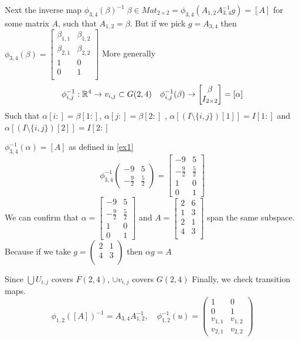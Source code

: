 \documentclass[11pt,a4paper]{report}
\begin{document}
Next the inverse map  $\phi_{3,4}(\beta)^{-1} \; \beta \in Mat_{2 \times 2} = \phi_{3,4}(A_{1,2} A_{3,4}^{-1} g) = [A] $ for some matrix $A$, such that $A_{1,2} = \beta$.
But if we pick $g = A_{3,4}$ then 
$ \phi_{3,4}(\beta) =
\begin{bmatrix}
    \beta_{1,1} & \beta_{1,2} \\ 
    \beta_{2,1} & \beta_{2,2} \\
    1 & 0 \\ 
    0 & 1 \\
\end{bmatrix}
$
More generally
$$\phi_{i,j}^{-1} : \mathbb{R}^4 \to v_{i,j} \subset G(2,4) \quad \phi_{i,j}^{-1}(\beta) \to 
\begin{bmatrix}
    \beta \\
    I_{2 \times 2}
\end{bmatrix} = [\alpha]
$$
Such that $\alpha [i:] = \beta[1:]$, $\alpha[j:] = \beta[2:]$ , $\alpha[ (I \setminus \{i,j\})[1] ] = I[1:]$ and
$\alpha[ (I \setminus \{i,j \})[2] ] = I[2:]$
\newline
\begin{Ex}
   $ \phi_{3,4}^{-1} (\alpha) = [A] $ as defined in \ref{ex1}
   $$ \phi_{3,4}^{-1}  \begin{pmatrix} -9 & 5 \\ -\frac{9}{2} & \frac{5}{2} \end{pmatrix} = \begin{bmatrix} -9 & 5 \\ -\frac{9}{2} & \frac{5}{2} \\ 1 & 0 \\ 0 & 1 \end{bmatrix} $$ 
   We can confirm that $ \alpha = \begin{bmatrix} -9 & 5 \\ -\frac{9}{2} & \frac{5}{2} \\ 1 & 0 \\ 0 & 1 \end{bmatrix}$ and $A = \begin{bmatrix}
        2 & 6 \\
        1 & 3 \\
        2 & 1 \\
        4 & 3 \\
    \end{bmatrix}$
    span the same subspace.
    Because if we take $g = \begin{pmatrix} 2 & 1 \\ 4 & 3 \\ \end{pmatrix}$
    then $\alpha g = A$
\end{Ex}
Since $\bigcup U_{i,j}$ covers $F(2,4)$, $\cup v_{i,j}$ covers $G(2,4)$
Finally, we check transition maps.
$$ \phi_{1,2}([A])^{-1} = A_{3,4} A_{1,2}^{-1}, \quad \phi_{1,2}^{-1}(u) =
\begin{pmatrix}
1 & 0 \\
0 & 1 \\
v_{1,1} & v_{1,2} \\
v_{2,1} & v_{2,2}
\end{pmatrix}
$$
\end{document}
